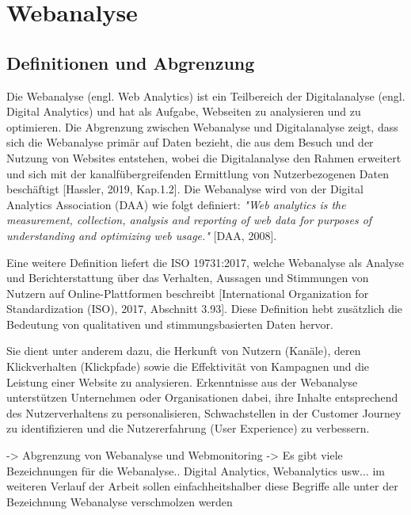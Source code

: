 \chapter{Webanalyse} %
\label{ch:webanalyse} 

\section{Definitionen und Abgrenzung} %
Die Webanalyse (engl. Web Analytics) ist ein Teilbereich der Digitalanalyse (engl. Digital Analytics) und hat als Aufgabe, Webseiten zu analysieren und zu optimieren. Die Abgrenzung zwischen Webanalyse und Digitalanalyse zeigt, dass sich die Webanalyse primär auf Daten bezieht, die aus dem Besuch und der Nutzung von Websites entstehen, wobei die Digitalanalyse den Rahmen erweitert und sich mit der kanalfübergreifenden Ermittlung von Nutzerbezogenen Daten beschäftigt [Hassler, 2019, Kap.1.2]. Die Webanalyse wird von der Digital Analytics Association (DAA) wie folgt definiert: \textit{"Web analytics is the measurement, collection, analysis and reporting of web data for purposes of understanding and optimizing web usage."} [DAA, 2008].

Eine weitere Definition liefert die ISO 19731:2017, welche Webanalyse als Analyse und Berichterstattung über das Verhalten, Aussagen und Stimmungen von Nutzern auf Online-Plattformen beschreibt [International Organization for Standardization (ISO), 2017, Abschnitt 3.93]. Diese Definition hebt zusätzlich die Bedeutung von qualitativen und stimmungsbasierten Daten hervor.

Sie dient unter anderem dazu, die Herkunft von Nutzern (Kanäle), deren Klickverhalten (Klickpfade) sowie die Effektivität von Kampagnen und die Leistung einer Website zu analysieren. Erkenntnisse aus der Webanalyse unterstützen Unternehmen oder Organisationen dabei, ihre Inhalte entsprechend des Nutzerverhaltens zu personalisieren, Schwachstellen in der Customer Journey zu identifizieren und die Nutzererfahrung (User Experience) zu verbessern.

-> Abgrenzung von Webanalyse und Webmonitoring
-> Es gibt viele Bezeichnungen für die Webanalyse.. Digital Analytics, Webanalytics usw... im weiteren Verlauf der Arbeit sollen einfachheitshalber diese Begriffe alle unter der Bezeichnung Webanalyse verschmolzen werden 

